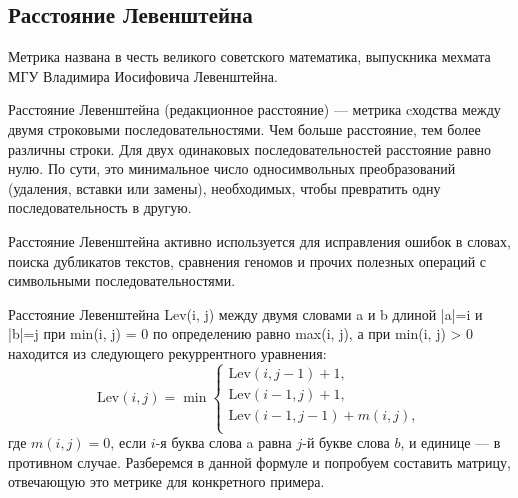 \documentclass[titlepage,12pt]{article}
\begin{document}
\subsection{Расстояние Левенштейна}  
Метрика названа в честь великого советского математика, выпускника мехмата МГУ Владимира Иосифовича Левенштейна. 

Расстояние Левенштейна (редакционное расстояние) --- метрика cходства между двумя строковыми последовательностями. Чем больше расстояние, тем более различны строки. Для двух одинаковых последовательностей расстояние равно нулю. По сути, это минимальное число односимвольных преобразований (удаления, вставки или замены), необходимых, чтобы превратить одну последовательность в другую.

Расстояние Левенштейна активно используется для исправления ошибок в словах, поиска дубликатов текстов, сравнения геномов и прочих полезных операций с символьными последовательностями.

Расстояние Левенштейна Lev(i, j) между двумя словами a и b
длиной |a|=i и |b|=j при min(i, j) = 0 по определению равно max(i, j), а
при min(i, j) > 0 находится из следующего рекуррентного уравнения:
\begin{equation*}
\text{Lev}(i,j) = \min
 \begin{cases}
   \text{Lev}(i, j-1)+1,\\
   \text{Lev}(i-1, j)+1,\\
   \text{Lev}(i-1, j-1)+m(i,j),\\
 \end{cases}
\end{equation*}
где $m(i, j)=0$, если $i$-я буква слова a равна $j$-й букве
слова $b$, и единице --- в противном случае. Разберемся в данной формуле и попробуем составить матрицу, отвечающую это метрике для конкретного примера.
\end{document}
